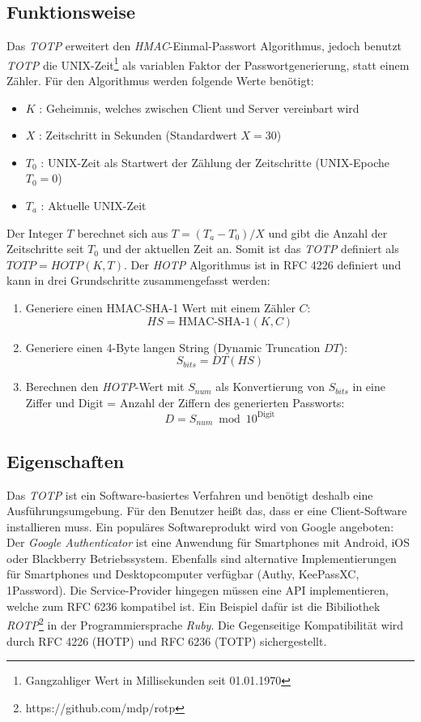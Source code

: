 \documentclass[11pt,a4paper,ngerman]{scrreprt}
\begin{document}
\subsection{Funktionsweise}
Das \textit{TOTP} erweitert den \textit{HMAC}-Einmal-Passwort Algorithmus, jedoch benutzt \textit{TOTP} die UNIX-Zeit\footnote{Gangzahliger Wert in Millisekunden seit 01.01.1970} als variablen Faktor der Passwortgenerierung, statt einem Zähler. Für den Algorithmus werden folgende Werte benötigt:
\begin{itemize}
    \item $K$ : Geheimnis, welches zwischen Client und Server vereinbart wird
    \item $X$ : Zeitschritt in Sekunden (Standardwert $X = 30$)
    \item $T_0$ : UNIX-Zeit als Startwert der Zählung der Zeitschritte (UNIX-Epoche $T_0 = 0$)
    \item $T_a$ : Aktuelle UNIX-Zeit
\end{itemize}
Der Integer $T$ berechnet sich aus $T = (T_a - T_0) / X$ und gibt die Anzahl der Zeitschritte seit $T_0$ und der aktuellen Zeit an. Somit ist das \textit{TOTP} definiert als $TOTP = HOTP(K, T)$. Der \textit{HOTP} Algorithmus ist in RFC 4226 \cite{rfc4226} definiert und kann in drei Grundschritte zusammengefasst werden:
\begin{enumerate}
    \item Generiere einen HMAC-SHA-1 Wert mit einem Zähler $C$: 
    \[
        HS = \textrm{HMAC-SHA-1}(K, C)
    \]
    \item Generiere einen 4-Byte langen String (Dynamic Truncation $DT$): 
    \[
        S_{bits} = DT(HS)
    \]
    \item Berechnen den \textit{HOTP}-Wert mit $S_{num}$ als Konvertierung von $S_{bits}$ in eine Ziffer und Digit = Anzahl der Ziffern des generierten Passworts:
    \[
        D = S_{num} \bmod 10^{\textrm{Digit}}
    \]
\end{enumerate}
\subsection{Eigenschaften}
Das \textit{TOTP} ist ein Software-basiertes Verfahren und benötigt deshalb eine Ausführungsumgebung. Für den Benutzer heißt das, dass er eine Client-Software installieren muss. Ein populäres Softwareprodukt wird von Google angeboten: Der \textit{Google Authenticator} ist eine Anwendung für Smartphones mit Android, iOS oder Blackberry Betriebssystem. Ebenfalls sind alternative Implementierungen für Smartphones und Desktopcomputer verfügbar (Authy, KeePassXC, 1Password). Die Service-Provider hingegen müssen eine API implementieren, welche zum RFC 6236 kompatibel ist. Ein Beispiel dafür ist die Bibiliothek \textit{ROTP}\footnote{https://github.com/mdp/rotp} in der Programmiersprache \textit{Ruby}. Die Gegenseitige Kompatibilität wird durch RFC 4226 (HOTP) \cite{rfc4226} und RFC 6236 (TOTP) \cite{rfc6238} sichergestellt.
\end{document}
